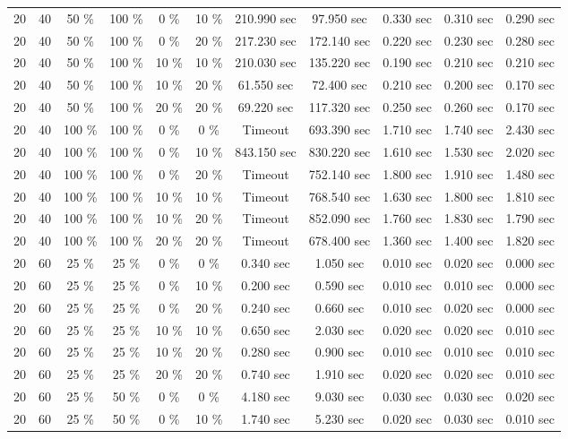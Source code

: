 \documentclass{article}
\begin{document}
\begin{longtable}[]{@{}ccccccccccc@{}}
20 & 40 & 50 \% & 100 \% & 0 \% & 10 \% & 210.990 sec & 97.950 sec & 0.330 sec & 0.310 sec & 0.290 sec \\
20 & 40 & 50 \% & 100 \% & 0 \% & 20 \% & 217.230 sec & 172.140 sec & 0.220 sec & 0.230 sec & 0.280 sec \\
20 & 40 & 50 \% & 100 \% & 10 \% & 10 \% & 210.030 sec & 135.220 sec & 0.190 sec & 0.210 sec & 0.210 sec \\
20 & 40 & 50 \% & 100 \% & 10 \% & 20 \% & 61.550 sec & 72.400 sec & 0.210 sec & 0.200 sec & 0.170 sec \\
20 & 40 & 50 \% & 100 \% & 20 \% & 20 \% & 69.220 sec & 117.320 sec & 0.250 sec & 0.260 sec & 0.170 sec \\
20 & 40 & 100 \% & 100 \% & 0 \% & 0 \% & Timeout & 693.390 sec & 1.710 sec & 1.740 sec & 2.430 sec \\
20 & 40 & 100 \% & 100 \% & 0 \% & 10 \% & 843.150 sec & 830.220 sec & 1.610 sec & 1.530 sec & 2.020 sec \\
20 & 40 & 100 \% & 100 \% & 0 \% & 20 \% & Timeout & 752.140 sec & 1.800 sec & 1.910 sec & 1.480 sec \\
20 & 40 & 100 \% & 100 \% & 10 \% & 10 \% & Timeout & 768.540 sec & 1.630 sec & 1.800 sec & 1.810 sec \\
20 & 40 & 100 \% & 100 \% & 10 \% & 20 \% & Timeout & 852.090 sec & 1.760 sec & 1.830 sec & 1.790 sec \\
20 & 40 & 100 \% & 100 \% & 20 \% & 20 \% & Timeout & 678.400 sec & 1.360 sec & 1.400 sec & 1.820 sec \\
20 & 60 & 25 \% & 25 \% & 0 \% & 0 \% & 0.340 sec & 1.050 sec & 0.010 sec & 0.020 sec & 0.000 sec \\
20 & 60 & 25 \% & 25 \% & 0 \% & 10 \% & 0.200 sec & 0.590 sec & 0.010 sec & 0.010 sec & 0.000 sec \\
20 & 60 & 25 \% & 25 \% & 0 \% & 20 \% & 0.240 sec & 0.660 sec & 0.010 sec & 0.020 sec & 0.000 sec \\
20 & 60 & 25 \% & 25 \% & 10 \% & 10 \% & 0.650 sec & 2.030 sec & 0.020 sec & 0.020 sec & 0.010 sec \\
20 & 60 & 25 \% & 25 \% & 10 \% & 20 \% & 0.280 sec & 0.900 sec & 0.010 sec & 0.010 sec & 0.010 sec \\
20 & 60 & 25 \% & 25 \% & 20 \% & 20 \% & 0.740 sec & 1.910 sec & 0.020 sec & 0.020 sec & 0.010 sec \\
20 & 60 & 25 \% & 50 \% & 0 \% & 0 \% & 4.180 sec & 9.030 sec & 0.030 sec & 0.030 sec & 0.020 sec \\
20 & 60 & 25 \% & 50 \% & 0 \% & 10 \% & 1.740 sec & 5.230 sec & 0.020 sec & 0.030 sec & 0.010 sec \\

\end{longtable}
\end{document}
